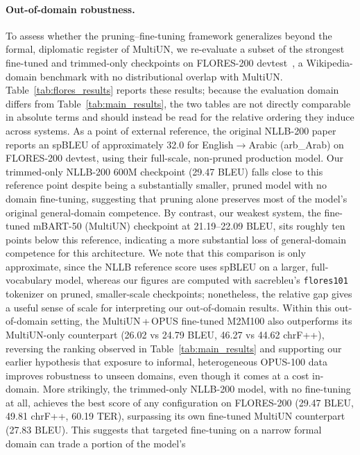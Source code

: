 \documentclass{article}
\begin{document}
	\paragraph{Out-of-domain robustness.}
	To assess whether the pruning--fine-tuning framework generalizes beyond the formal,
	diplomatic register of MultiUN, we re-evaluate a subset of the strongest fine-tuned
	and trimmed-only checkpoints on FLORES-200 devtest~\citep{nllb2022no}, a
	Wikipedia-domain benchmark with no distributional overlap with MultiUN.
	Table~\ref{tab:flores_results} reports these results; because the evaluation domain
	differs from Table~\ref{tab:main_results}, the two tables are not directly comparable
	in absolute terms and should instead be read for the relative ordering they induce
	across systems. As a point of external reference, the original NLLB-200 paper
	reports an spBLEU of approximately 32.0 for English$\to$Arabic (arb\_Arab) on
	FLORES-200 devtest, using their full-scale, non-pruned production model. Our
	trimmed-only NLLB-200 600M checkpoint (29.47 BLEU) falls close to this reference
	point despite being a substantially smaller, pruned model with no domain
	fine-tuning, suggesting that pruning alone preserves most of the model's original
	general-domain competence. By contrast, our weakest system, the fine-tuned
	mBART-50 (MultiUN) checkpoint at 21.19--22.09 BLEU, sits roughly ten points below
	this reference, indicating a more substantial loss of general-domain competence for
	this architecture. We note that this comparison is only approximate, since the
	NLLB reference score uses spBLEU on a larger, full-vocabulary model, whereas our
	figures are computed with sacrebleu's \texttt{flores101} tokenizer on pruned,
	smaller-scale checkpoints; nonetheless, the relative gap gives a useful sense of
	scale for interpreting our out-of-domain results. Within this out-of-domain
	setting, the MultiUN\,+\,OPUS fine-tuned M2M100 also outperforms its MultiUN-only
	counterpart (26.02 vs 24.79 BLEU, 46.27 vs 44.62 chrF++), reversing the ranking
	observed in Table~\ref{tab:main_results} and supporting our earlier hypothesis
	that exposure to informal, heterogeneous OPUS-100 data improves robustness to
	unseen domains, even though it comes at a cost in-domain. More strikingly, the
	trimmed-only NLLB-200 model, with no fine-tuning at all, achieves the best score
	of any configuration on FLORES-200 (29.47 BLEU, 49.81 chrF++, 60.19 TER),
	surpassing its own fine-tuned MultiUN counterpart (27.83 BLEU). This suggests that
	targeted fine-tuning on a narrow formal domain can trade a portion of the model's
\end{document}
